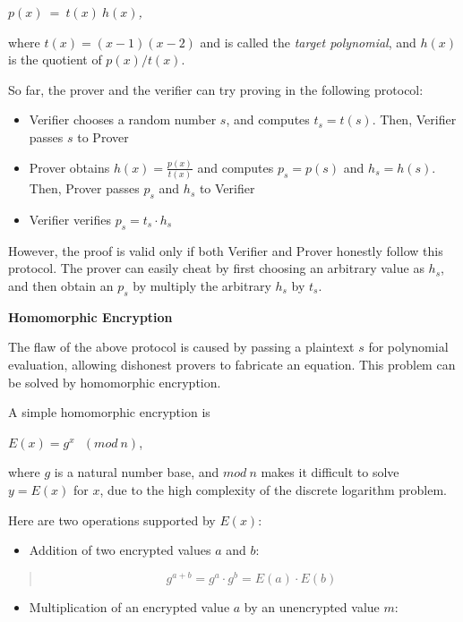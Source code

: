 \documentclass[
]{report}
\providecommand{\tightlist}{%
  \setlength{\itemsep}{0pt}\setlength{\parskip}{0pt}}
\begin{document}
\(p(x)\  = \ t(x)\ h(x)\)\emph{,}

where \(t(x) = (x - 1)(x - 2)\) and is called the \emph{target
polynomial}, and \(h(x)\) is the quotient of \(p(x)\text{/}t(x)\).

So far, the prover and the verifier can try proving in the following
protocol:

\begin{itemize}
\item
  Verifier chooses a random number \(s\), and computes \(t_{s} = t(s)\).
  Then, Verifier passes \(s\) to Prover
\item
  Prover obtains \(h(x) = \frac{p(x)}{t(x)}\) and computes
  \(p_{s} = p(s)\) and \(h_{s} = h(s)\). Then, Prover passes \(p_{s}\)
  and \(h_{s}\) to Verifier
\item
  Verifier verifies \(p_{s} = t_{s} \cdot h_{s}\)
\end{itemize}

However, the proof is valid only if both Verifier and Prover honestly
follow this protocol. The prover can easily cheat by first choosing an
arbitrary value as \(h_{s}\), and then obtain an \(p_{s}\) by multiply
the arbitrary \(h_{s}\) by \(t_{s}\).

\textbf{Homomorphic Encryption}

The flaw of the above protocol is caused by passing a plaintext \(s\)
for polynomial evaluation, allowing dishonest provers to fabricate an
equation. This problem can be solved by homomorphic encryption.

A simple homomorphic encryption is

\(E(x) = g^{x}\ \ \ (mod\ n)\),

where \(g\) is a natural number base, and \(mod\ n\) makes it difficult
to solve \(y = E(x)\) for \(x\), due to the high complexity of the
discrete logarithm problem.

Here are two operations supported by \(E(x)\):

\begin{itemize}
\tightlist
\item
  Addition of two encrypted values \(a\) and \(b\):
\end{itemize}

\begin{quote}
\[g^{a + b} = g^{a} \cdot g^{b} = E(a) \cdot E(b)\]
\end{quote}

\begin{itemize}
\tightlist
\item
  Multiplication of an encrypted value \(a\) by an unencrypted value
  \(m\):
\end{itemize}
\end{document}
